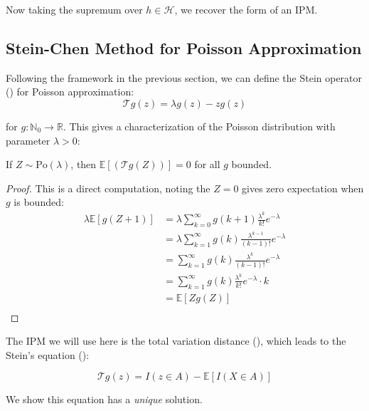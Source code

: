 \documentclass{article}
\begin{document}
Now taking the supremum over $h \in \mathcal{H}$, we recover the form of an IPM. 



\subsection{Stein-Chen Method for Poisson Approximation}  
Following the framework in the previous section, we can define the Stein operator () for Poisson approximation:
\begin{equation}
    \mathcal{T}g(z) = \lambda g(z) - zg(z)
\end{equation}

for $g: \mathbb{N}_0 \to \mathbb{R}$. This gives a characterization of the Poisson distribution with parameter $\lambda>0$:

\begin{proposition}
    \label{prop: direction1 poisson}
    If $Z\sim \text{Po}(\lambda)$, then $\mathbb{E}[(\mathcal{T}g(Z))]=0$ for all $g$ bounded.
\end{proposition}

\begin{proof}
This is a direct computation, noting the $Z=0$ gives zero expectation when $g$ is bounded:  
    \begin{align*}
        \lambda \mathbb{E}[g(Z+1)] &= \lambda \sum_{k=0}^\infty g(k+1) \frac{\lambda^k}{k!} e^{-\lambda}\\
        &= \lambda \sum_{k=1}^\infty g(k) \frac{\lambda^{k-1}}{(k-1)!} e^{-\lambda}\\
        &= \sum_{k=1}^\infty g(k) \frac{\lambda^k}{(k-1)!} e^{-\lambda}\\
        &= \sum_{k=1}^\infty g(k) \frac{\lambda^k}{k!} e^{-\lambda} \cdot k\\
        &= \mathbb{E}[Zg(Z)]\\
    \end{align*}
\end{proof}


The IPM we will use here is the total variation distance (), which leads to the Stein's equation ():

\begin{equation}
    \mathcal{T}g(z) = I(z \in A) - \mathbb{E}[I(X \in A)]
    \label{eq:poisson_stein_equation}
\end{equation}

We show this equation has a \textit{unique} solution.
\end{document}
